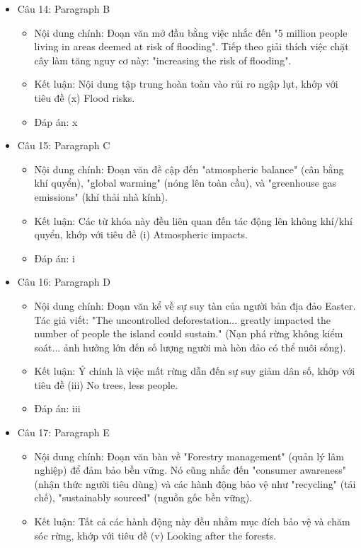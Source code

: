 \documentclass{../templateReading/cdreading}
\begin{document}
\begin{itemize}
\item Câu 14: Paragraph B
\begin{itemize}
\item Nội dung chính: Đoạn văn mở đầu bằng việc nhắc đến "5 million people living in areas deemed at risk of flooding". Tiếp theo giải thích việc chặt cây làm tăng nguy cơ này: "increasing the risk of flooding".
\item Kết luận: Nội dung tập trung hoàn toàn vào rủi ro ngập lụt, khớp với tiêu đề (x) Flood risks.
\item Đáp án: x
\end{itemize}
\item Câu 15: Paragraph C
\begin{itemize}
\item Nội dung chính: Đoạn văn đề cập đến "atmospheric balance" (cân bằng khí quyển), "global warming" (nóng lên toàn cầu), và "greenhouse gas emissions" (khí thải nhà kính).
\item Kết luận: Các từ khóa này đều liên quan đến tác động lên không khí/khí quyển, khớp với tiêu đề (i) Atmospheric impacts.
\item Đáp án: i
\end{itemize}
\item Câu 16: Paragraph D
\begin{itemize}
\item Nội dung chính: Đoạn văn kể về sự suy tàn của người bản địa đảo Easter. Tác giả viết: "The uncontrolled deforestation... greatly impacted the number of people the island could sustain." (Nạn phá rừng không kiểm soát... ảnh hưởng lớn đến số lượng người mà hòn đảo có thể nuôi sống).
\item Kết luận: Ý chính là việc mất rừng dẫn đến sự suy giảm dân số, khớp với tiêu đề (iii) No trees, less people.
\item Đáp án: iii
\end{itemize}
\item Câu 17: Paragraph E
\begin{itemize}
\item Nội dung chính: Đoạn văn bàn về "Forestry management" (quản lý lâm nghiệp) để đảm bảo bền vững. Nó cũng nhắc đến "consumer awareness" (nhận thức người tiêu dùng) và các hành động bảo vệ như "recycling" (tái chế), "sustainably sourced" (nguồn gốc bền vững).
\item Kết luận: Tất cả các hành động này đều nhằm mục đích bảo vệ và chăm sóc rừng, khớp với tiêu đề (v) Looking after the forests.

\end{itemize}
\end{itemize}
\end{document}
